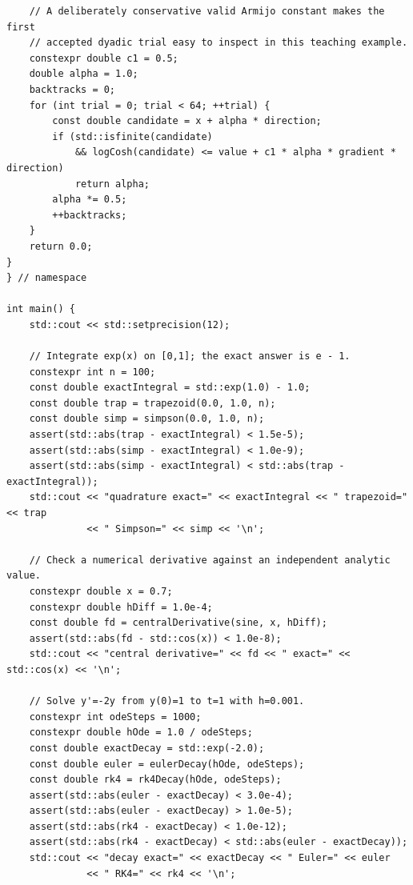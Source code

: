 \begin{verbatim}
    // A deliberately conservative valid Armijo constant makes the first
    // accepted dyadic trial easy to inspect in this teaching example.
    constexpr double c1 = 0.5;
    double alpha = 1.0;
    backtracks = 0;
    for (int trial = 0; trial < 64; ++trial) {
        const double candidate = x + alpha * direction;
        if (std::isfinite(candidate)
            && logCosh(candidate) <= value + c1 * alpha * gradient * direction)
            return alpha;
        alpha *= 0.5;
        ++backtracks;
    }
    return 0.0;
}
} // namespace

int main() {
    std::cout << std::setprecision(12);

    // Integrate exp(x) on [0,1]; the exact answer is e - 1.
    constexpr int n = 100;
    const double exactIntegral = std::exp(1.0) - 1.0;
    const double trap = trapezoid(0.0, 1.0, n);
    const double simp = simpson(0.0, 1.0, n);
    assert(std::abs(trap - exactIntegral) < 1.5e-5);
    assert(std::abs(simp - exactIntegral) < 1.0e-9);
    assert(std::abs(simp - exactIntegral) < std::abs(trap - exactIntegral));
    std::cout << "quadrature exact=" << exactIntegral << " trapezoid=" << trap
              << " Simpson=" << simp << '\n';

    // Check a numerical derivative against an independent analytic value.
    constexpr double x = 0.7;
    constexpr double hDiff = 1.0e-4;
    const double fd = centralDerivative(sine, x, hDiff);
    assert(std::abs(fd - std::cos(x)) < 1.0e-8);
    std::cout << "central derivative=" << fd << " exact=" << std::cos(x) << '\n';

    // Solve y'=-2y from y(0)=1 to t=1 with h=0.001.
    constexpr int odeSteps = 1000;
    constexpr double hOde = 1.0 / odeSteps;
    const double exactDecay = std::exp(-2.0);
    const double euler = eulerDecay(hOde, odeSteps);
    const double rk4 = rk4Decay(hOde, odeSteps);
    assert(std::abs(euler - exactDecay) < 3.0e-4);
    assert(std::abs(euler - exactDecay) > 1.0e-5);
    assert(std::abs(rk4 - exactDecay) < 1.0e-12);
    assert(std::abs(rk4 - exactDecay) < std::abs(euler - exactDecay));
    std::cout << "decay exact=" << exactDecay << " Euler=" << euler
              << " RK4=" << rk4 << '\n';


\end{verbatim}
